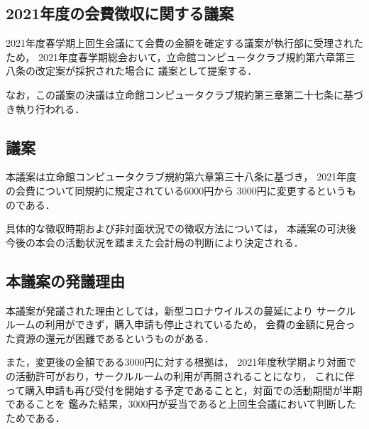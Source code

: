 \subsection*{2021年度の会費徴収に関する議案}

2021年度春学期上回生会議にて会費の金額を確定する議案が執行部に受理されたため，
2021年度春学期総会おいて，立命館コンピュータクラブ規約第六章第三八条の改定案が採択された場合に
議案として提案する．

なお，この議案の決議は立命館コンピュータクラブ規約第三章第二十七条に基づき執り行われる．


\subsection*{議案}
本議案は立命館コンピュータクラブ規約第六章第三十八条に基づき，
2021年度の会費について同規約に規定されている6000円から
3000円に変更するというものである．

具体的な徴収時期および非対面状況での徴収方法については，
本議案の可決後今後の本会の活動状況を踏まえた会計局の判断により決定される．


\subsection*{本議案の発議理由}
本議案が発議された理由としては，新型コロナウイルスの蔓延により
サークルルームの利用ができず，購入申請も停止されているため，
会費の金額に見合った資源の還元が困難であるというものがある．

また，変更後の金額である3000円に対する根拠は，
2021年度秋学期より対面での活動許可がおり，サークルルームの利用が再開されることになり，
これに伴って購入申請も再び受付を開始する予定であることと，対面での活動期間が半期であることを
鑑みた結果，3000円が妥当であると上回生会議において判断したためである．